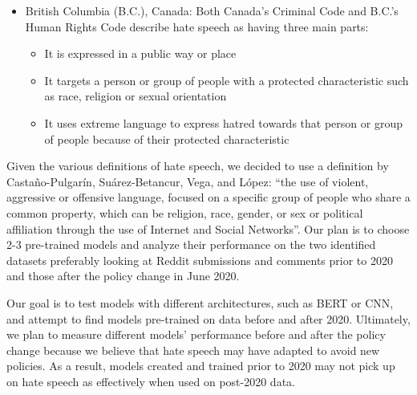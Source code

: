 \documentclass[conference]{IEEEtran}
\begin{document}
\begin{itemize}
\begin{itemize}
    \end{itemize}
        \item British Columbia (B.C.), Canada: Both Canada’s Criminal Code and B.C.’s Human Rights Code describe hate speech as having three main parts:
        \begin{itemize}
            \item It is expressed in a public way or place
            \item It targets a person or group of people with a protected characteristic such as race, religion or sexual orientation
            \item It uses extreme language to express hatred towards that person or group of people because of their protected characteristic\cite{b26}
        \end{itemize}  
\end{itemize}    

Given the various definitions of hate speech, we decided to use a definition by Castaño-Pulgarín, Suárez-Betancur, Vega, and López\cite{b27}: “the use of violent, aggressive or offensive language, focused on a specific group of people who share a common property, which can be religion, race, gender, or sex or political affiliation through the use of Internet and Social Networks”. Our plan is to choose 2-3 pre-trained models and analyze their performance on the two identified datasets preferably looking at Reddit submissions and comments prior to 2020 and those after the policy change in June 2020.

Our goal is to test models with different architectures, such as BERT or CNN, and attempt to find models pre-trained on data before and after 2020. Ultimately, we plan to measure different models’ performance before and after the policy change because we believe that hate speech may have adapted to avoid new policies. As a result, models created and trained prior to 2020 may not pick up on hate speech as effectively when used on post-2020 data. 
\end{document}
